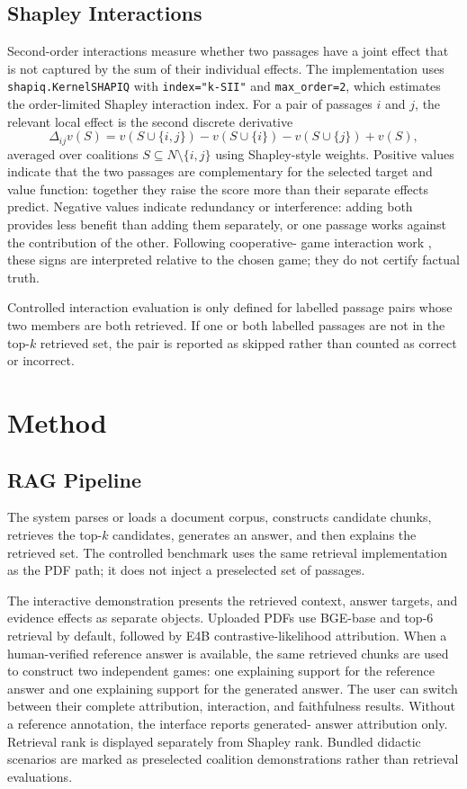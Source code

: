 \documentclass[10pt]{article}
\begin{document}
\subsection{Shapley Interactions}
Second-order interactions measure whether two passages have a joint effect
that is not captured by the sum of their individual effects. The implementation
uses \texttt{shapiq.KernelSHAPIQ} with \texttt{index="k-SII"} and
\texttt{max\_order=2}, which estimates the order-limited Shapley interaction
index. For a pair of passages $i$ and $j$, the relevant local effect is the
second discrete derivative
\begin{equation}
\Delta_{ij}v(S) =
v(S \cup \{i,j\}) - v(S \cup \{i\}) - v(S \cup \{j\}) + v(S),
\end{equation}
averaged over coalitions $S \subseteq N \setminus \{i,j\}$ using Shapley-style
weights. Positive values indicate that the two passages are complementary for
the selected target and value function: together they raise the score more than
their separate effects predict. Negative values indicate redundancy or
interference: adding both provides less benefit than adding them separately, or
one passage works against the contribution of the other. Following cooperative-
game interaction work \cite{grabisch1999interaction}, these signs are
interpreted relative to the chosen game; they do not certify factual truth.

Controlled interaction evaluation is only defined for labelled passage pairs
whose two members are both retrieved. If one or both labelled passages are not
in the top-$k$ retrieved set, the pair is reported as skipped rather than
counted as correct or incorrect.

\section{Method}
\subsection{RAG Pipeline}
The system parses or loads a document corpus, constructs candidate chunks,
retrieves the top-$k$ candidates, generates an answer, and then explains the
retrieved set. The controlled benchmark uses the same retrieval implementation
as the PDF path; it does not inject a preselected set of passages.

The interactive demonstration presents the retrieved context, answer targets,
and evidence effects as separate objects. Uploaded PDFs use BGE-base and top-6
retrieval by default, followed by E4B contrastive-likelihood attribution. When
a human-verified reference answer is available, the same retrieved chunks are
used to construct two independent games: one explaining support for the
reference answer and one explaining support for the generated answer. The user
can switch between their complete attribution, interaction, and faithfulness
results. Without a reference annotation, the interface reports generated-
answer attribution only. Retrieval rank is displayed separately from Shapley
rank. Bundled didactic scenarios are marked as preselected coalition
demonstrations rather than retrieval evaluations.
\end{document}
